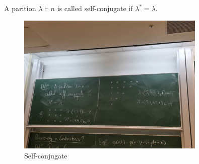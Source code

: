 \begin{definition}
    A parition \(\lambda \vdash n\) is called self-conjugate if \(\lambda  ^* = \lambda \).  
\end{definition}
\begin{figure}[H]
    \centering
    \includegraphics[width=0.8\textwidth]{./Figures/20250923_154927.jpg}
    \caption{Self-conjugate}
    \label{fig:self-conjugaet}
\end{figure}

